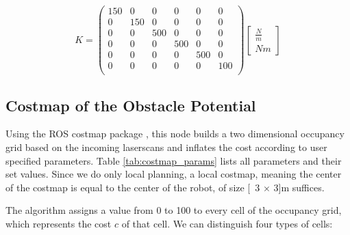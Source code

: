 \begin{equation}
K = \begin{pmatrix}
150 & 0 & 0 & 0 & 0 & 0 \\
0 & 150 & 0 & 0 & 0 & 0 \\
0 & 0 & 500 & 0 & 0 & 0 \\
0 & 0 & 0 & 500 & 0 & 0 \\
0 & 0 & 0 & 0 & 500 & 0 \\
0 & 0 & 0 & 0 & 0 & 100 \\
\end{pmatrix}
\begin{bmatrix}
\frac{N}{m} \\
N m
\end{bmatrix}
\label{eq:K}
\end{equation}

\subsection{Costmap of the Obstacle Potential}
	\label{sec:costmap}
	
Using the ROS costmap package \citep{rosCostmap}, this node builds a two dimensional occupancy grid based on the incoming laserscans and inflates the cost according to user specified parameters. Table \ref{tab:costmap_params} lists all parameters and their set values. Since we do only local planning, a local costmap, meaning the center of the costmap is equal to the center of the robot, of size \unit[3 $\times$ 3]{m} suffices.

The algorithm assigns a value from 0 to 100 to every cell of the occupancy grid, which represents the cost $c$ of that cell. We can distinguish four types of cells:

